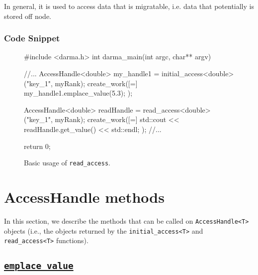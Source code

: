 \begin{subs}
In general, it is used to access data that is migratable, i.e. data 
that potentially is stored off node.


\subsubsection{Code Snippet} 
\begin{figure}[!h]
\begin{CppCodeNumb}
#include <darma.h>
int darma_main(int argc, char** argv)
{
	//...
  AccessHandle<double> my_handle1 = initial_access<double>("key_1", myRank);
  create_work([=]{
  	my_handle1.emplace_value(5.3);
  });

  AccessHandle<double> readHandle = read_access<double>("key_1", myRank);
  create_work([=]{
  	std::cout << readHandle.get_value() << std::endl;
  });
  //...

  return 0;
}
\end{CppCodeNumb}
\label{fig:fe_api_initialaccess}
\caption{Basic usage of \texttt{read\_access}.}
\end{figure}

\end{subs}














\clearpage
\section{AccessHandle methods}

In this section, we describe the methods that can be called 
on \texttt{AccessHandle<T>} objects (i.e., the objects returned by the 
\texttt{initial\_access<T>} and \texttt{read\_access<T>} functions).


\subsection{\underline{\texttt{emplace\_value}}}
\label{ssec:api_fe_emplace_value}

